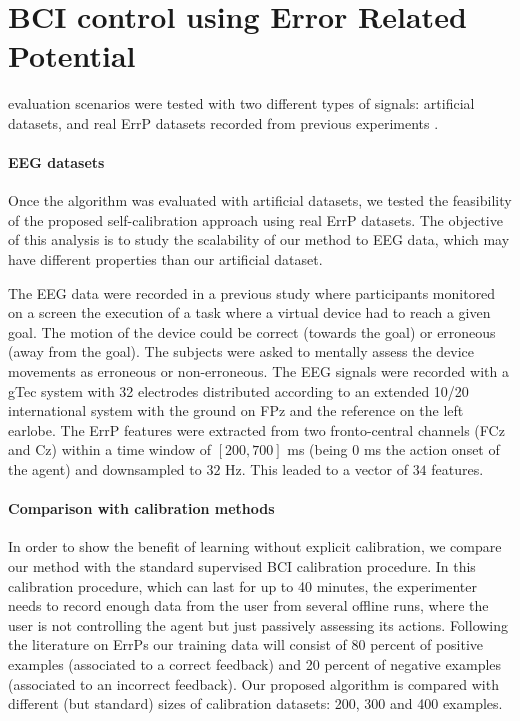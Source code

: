 \section{BCI control using Error Related Potential}

evaluation scenarios were tested with two different types of signals: artificial datasets, and real ErrP datasets recorded from previous experiments \cite{iturrate2013task}.

\paragraph{EEG datasets}
Once the algorithm was evaluated with artificial datasets, we tested the feasibility of the proposed self-calibration approach using real ErrP datasets. The objective of this analysis is to study the scalability of our method to EEG data, which may have different properties than our artificial dataset. 

The EEG data were recorded in a previous study \cite{iturrate2013task} where participants monitored on a screen the execution of a task where a virtual device had to reach a given goal. The motion of the device could be correct (towards the goal) or erroneous (away from the goal). The subjects were asked to mentally assess the device movements as erroneous or non-erroneous. The EEG signals were recorded with a gTec system with 32 electrodes distributed according to an extended 10/20 international system with the ground on FPz and the reference on the left earlobe. The ErrP features were extracted from two fronto-central channels (FCz and Cz) within a time window of $[200,700]$ ms (being 0 ms the action onset of the agent) and downsampled to $32$ Hz. This leaded to a vector of $34$ features.

\paragraph{Comparison with calibration methods}
In order to show the benefit of learning without explicit calibration, we compare our method with the standard supervised BCI calibration procedure. In this calibration procedure, which can last for up to 40 minutes, the experimenter needs to record enough data from the user from several offline runs, where the user is not controlling the agent but just passively assessing its actions.
%
Following the literature on ErrPs \cite{chavarriaga2010learning,iturrate2013task} our training data will consist of 80 percent of positive examples (associated to a correct feedback) and 20 percent of negative examples (associated to an incorrect feedback). Our proposed algorithm is compared with different (but standard) sizes of calibration datasets: 200, 300 and 400 examples.

